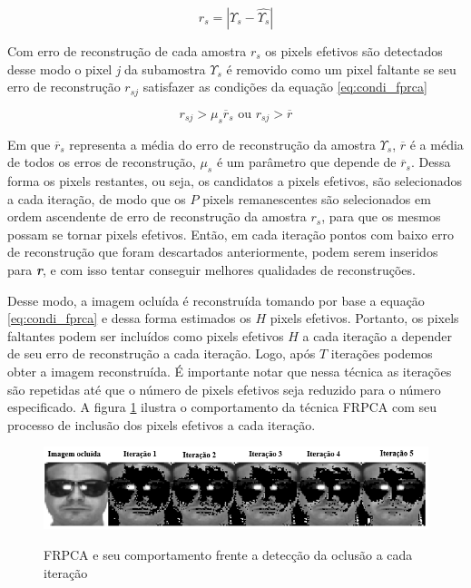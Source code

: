\begin{equation}
\label{eq:frpca1}
r_s = \left | \Upsilon_s - \hat{\Upsilon_s} \right |
\end{equation}

Com erro de reconstrução de cada amostra $r_s$ os pixels efetivos são detectados desse modo o pixel \textit{j} da subamostra $\Upsilon_s$ é removido como um pixel faltante se seu erro de reconstrução $r_{sj}$ satisfazer as condições da equação \ref{eq:condi_fprca}

\begin{equation}
\label{eq:condi_fprca}
r_{sj} > \mu_s \overline{r}_s \textrm{   ou  } r_{sj} > \overline{r}
\end{equation}

Em que $\overline{r}_s$ representa a média do erro de reconstrução da amostra $\Upsilon_s$, $\overline{r}$ é a média de todos os erros de reconstrução, $\mu_s$ é um parâmetro que depende  de $\overline{r}_s$. Dessa forma os pixels restantes, ou seja, os candidatos a pixels efetivos, são selecionados a cada iteração, de modo que os $P$ pixels remanescentes são selecionados em ordem ascendente de erro de reconstrução da amostra $r_s$, para que os mesmos possam se tornar pixels efetivos. Então, em cada iteração pontos com baixo erro de reconstrução que foram descartados anteriormente, podem serem inseridos para \textit{\textbf{r}}, e com isso tentar conseguir melhores qualidades de reconstruções.


Desse modo, a imagem ocluída é reconstruída tomando por base a equação \ref{eq:condi_fprca} e dessa forma estimados os $H$ pixels efetivos. Portanto, os pixels faltantes podem ser incluídos como pixels efetivos $H$ a cada iteração a depender de seu erro de reconstrução a cada iteração.  Logo, após $T$ iterações podemos obter a imagem reconstruída. É importante notar que nessa técnica as iterações são repetidas até que o número de pixels efetivos seja reduzido para o número especificado. A figura \ref{fig:frpca_esquema} ilustra o comportamento da técnica FRPCA com seu processo de inclusão dos pixels efetivos a cada iteração.


\begin{figure}[H]
\centering
\caption{FRPCA e seu comportamento frente a detecção da oclusão a cada iteração}
\includegraphics[scale =0.8]{imgs/frpca_esquema.png}
\label{fig:frpca_esquema}
\end{figure}




